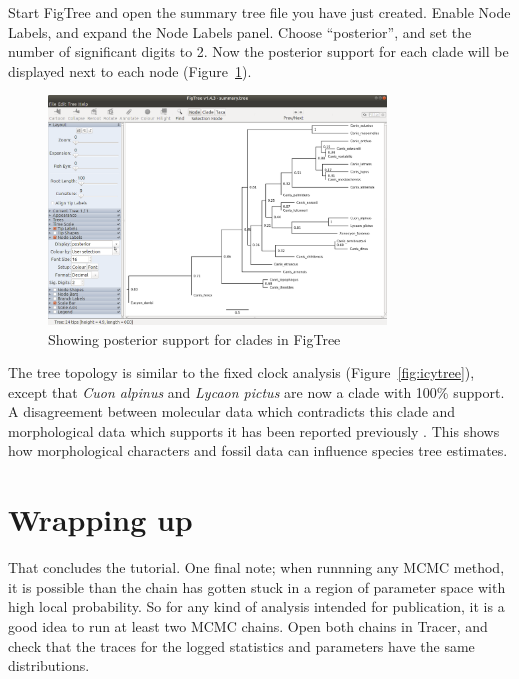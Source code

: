 \documentclass[12pt]{article}
\begin{document}
Start FigTree and open the summary tree file you have just created. Enable
Node Labels, and expand the Node Labels panel. Choose ``posterior'', and set
the number of significant digits to 2. Now the posterior support for each
clade will be displayed next to each node (Figure~\ref{fig:figtreeFBD}).

\begin{figure}[htb!]
\centering
\includegraphics[width=0.8\textwidth]{figures/figtreeFBD.png}
\caption
{Showing posterior support for clades in FigTree}
\label{fig:figtreeFBD}
\end{figure}

The tree topology is similar to the fixed clock analysis
(Figure~\ref{fig:icytree}), except that \textit{Cuon alpinus} and
\textit{Lycaon pictus} are now a clade with 100\% support. A disagreement
between molecular data which contradicts this clade and morphological
data which supports it has been reported previously \parencite{Zrzavy2004}. This shows
how morphological characters and fossil data can influence species tree
estimates.

\section{Wrapping up}

That concludes the tutorial. One final note; when runnning any MCMC method, it
is possible than the chain has gotten stuck in a region of parameter space
with high local probability. So for any kind of analysis intended for
publication, it is a good idea to run at least two MCMC chains. Open both
chains in Tracer, and check that the traces for the logged statistics and
parameters have the same distributions.

\printbibliography
\end{document}
